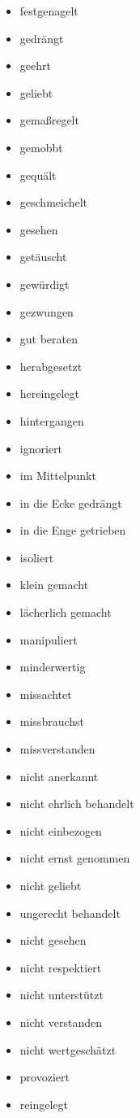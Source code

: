 \begin{multicols}{2}
\begin{itemize}
    \item festgenagelt
    \item gedrängt
    \item geehrt
    \item geliebt
    \item gemaßregelt
    \item gemobbt
    \item gequält
    \item geschmeichelt
    \item gesehen
    \item getäuscht
    \item gewürdigt
    \item gezwungen
    \item gut beraten
    \item herabgesetzt
    \item hereingelegt
    \item hintergangen
    \item ignoriert
    \item im Mittelpunkt
    \item in die Ecke gedrängt
    \item in die Enge getrieben
    \item isoliert
    \item klein gemacht
    \item lächerlich gemacht
    \item manipuliert
    \item minderwertig
    \item missachtet
    \item missbrauchst
    \item missverstanden
    \item nicht anerkannt
    \item nicht ehrlich behandelt
    \item nicht einbezogen
    \item nicht ernst genommen
    \item nicht geliebt
    \item ungerecht behandelt
    \item nicht gesehen
    \item nicht respektiert
    \item nicht unterstützt
    \item nicht verstanden
    \item nicht wertgeschätzt
    \item provoziert
    \item reingelegt

\end{itemize}
\end{multicols}
